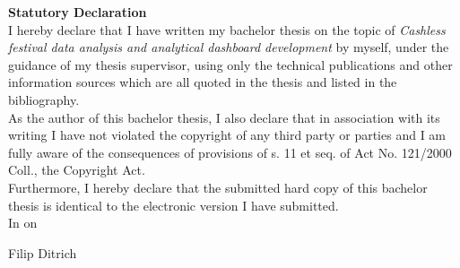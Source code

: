 \newpage
\pagestyle{empty}

\noindent
{\large\bfseries Statutory Declaration}\\

\noindent
I hereby declare that I have written my bachelor thesis on the topic of \textit{Cashless festival data analysis and analytical dashboard development} by myself, under the guidance of my thesis supervisor, using only the technical publications and other information sources which are all quoted in the thesis and listed in the bibliography.\\

\noindent
As the author of this bachelor thesis, I also declare that in association with its writing I have not violated the copyright of any third party or parties and I am fully aware of the consequences of provisions of s. 11 et seq. of Act No. 121/2000 Coll., the Copyright Act.\\

\noindent
Furthermore, I hereby declare that the submitted hard copy of this bachelor thesis is identical to the electronic version I have submitted.\\

\vspace{18mm}
\noindent
In \makebox[4cm]{\dotfill} on \makebox[2.5cm]{\dotfill}
\hspace*{\fill}
\makebox[4cm]{\dotfill}

\begin{flushright}
    \noindent
    Filip Ditrich
\end{flushright}
